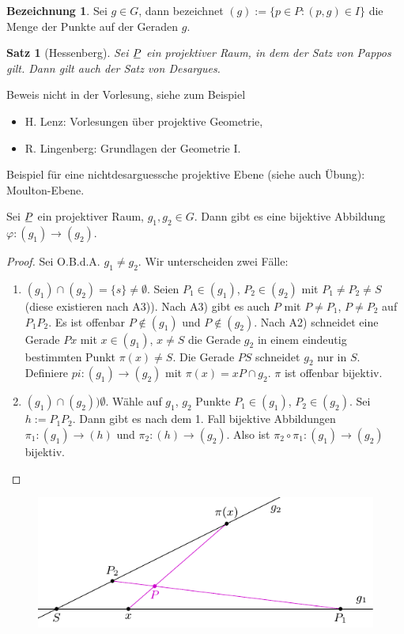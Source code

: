 \documentclass[
 a4paper,
 12pt,
 parskip=half
 ]{scrartcl}
\theoremstyle{plain}
\newtheorem*{thm*}{Satz}
\theoremstyle{definition}
\newtheorem*{deno*}{Bezeichnung}
\begin{document}
\begin{deno*}
 Sei $g \in G$, dann bezeichnet $(g) := \{ p \in P : (p,g) \in I \}$ die Menge der Punkte auf der Geraden $g$.
\end{deno*}

\begin{thm*}[Hessenberg]
 Sei $\proj$ ein projektiver Raum, in dem der Satz von Pappos gilt. Dann gilt auch der Satz von Desargues.
\end{thm*}

Beweis nicht in der Vorlesung, siehe zum Beispiel
\begin{itemize}
 \item H. Lenz: Vorlesungen über projektive Geometrie,
 \item R. Lingenberg: Grundlagen der Geometrie I.
\end{itemize}

Beispiel für eine nichtdesarguessche projektive Ebene (siehe auch Übung): Moulton-Ebene.

\begin{lem}
 Sei $\proj$ ein projektiver Raum, $g_1, g_2 \in G$. Dann gibt es eine bijektive Abbildung $\varphi:(g_1) \to (g_2)$.
\end{lem}

\begin{proof}
 Sei O.B.d.A. $g_1 \ne g_2$. Wir unterscheiden zwei Fälle:
 \begin{enumerate}
  \item $(g_1) \cap (g_2) = \{ s \} \ne \emptyset$. Seien $P_1 \in (g_1)$, $P_2 \in (g_2)$ mit $P_1 \ne P_2 \ne S$ (diese existieren nach A3)). Nach A3) gibt es auch $P$ mit $P \ne P_1$, $P \ne P_2$ auf $P_1 P_2$. Es ist offenbar $P \notin (g_1)$ und $P \notin (g_2)$. Nach A2) schneidet eine Gerade $Px$ mit $x \in (g_1)$, $x \ne S$ die Gerade $g_2$ in einem eindeutig bestimmten Punkt $\pi(x) \ne S$. Die Gerade $PS$ schneidet $g_2$ nur in $S$. Definiere $pi:(g_1) \to (g_2)$ mit $\pi( x ) = xP \cap g_2$. $\pi$ ist offenbar bijektiv.
  \item $(g_1) \cap (g_2) ) \emptyset$. Wähle  auf $g_1$, $g_2$ Punkte $P_1 \in (g_1)$, $P_2 \in (g_2)$. Sei $h := P_1 P_2$. Dann gibt es nach dem 1. Fall bijektive Abbildungen $\pi_1: (g_1) \to (h)$ und $\pi_2: (h) \to (g_2)$. Also ist $\pi_2 \circ \pi_1: (g_1) \to (g_2)$ bijektiv. \qedhere
 \end{enumerate}
\end{proof}

\begin{figure}[ht]
 \center
 \includegraphics[width=12cm]{img/lemma27}
\end{figure}
\end{document}
